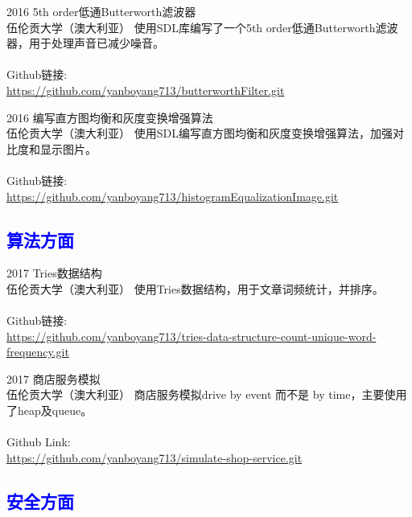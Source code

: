 \documentclass[]{friggeri-cv}
\begin{document}
\begin{entrylist}
  \entry
    {2016}
    {5th order低通Butterworth滤波器\\}
    {伍伦贡大学（澳大利亚）}
    {使用SDL库编写了一个5th order低通Butterworth滤波器，用于处理声音已减少噪音。 
     \\\\ Github链接: \\{\small\url{https://github.com/yanboyang713/butterworthFilter.git}}}
\end{entrylist}

\begin{entrylist}
  \entry
    {2016}
    {编写直方图均衡和灰度变换增强算法\\}
    {伍伦贡大学（澳大利亚）}
    {使用SDL编写直方图均衡和灰度变换增强算法，加强对比度和显示图片。
     \\\\ Github链接: \\{\small\url{https://github.com/yanboyang713/histogramEqualizationImage.git}}}
\end{entrylist}

\subsection{\textcolor{blue}{算法方面}}

\begin{entrylist}
  \entry
    {2017}
    {Tries数据结构\\}
    {伍伦贡大学（澳大利亚）}
    {使用Tries数据结构，用于文章词频统计，并排序。
     \\\\ Github链接: \\{\small\url{https://github.com/yanboyang713/tries-data-structure-count-unique-word-frequency.git}}}
\end{entrylist}

\begin{entrylist}
  \entry
    {2017}
    {商店服务模拟\\}
    {伍伦贡大学（澳大利亚）}
    {商店服务模拟drive by event 而不是 by time，主要使用了heap及queue。
     \\\\ Github Link: \\{\small\url{https://github.com/yanboyang713/simulate-shop-service.git}}}
\end{entrylist}

\subsection*{\textcolor{blue}{安全方面}}
\end{document}
